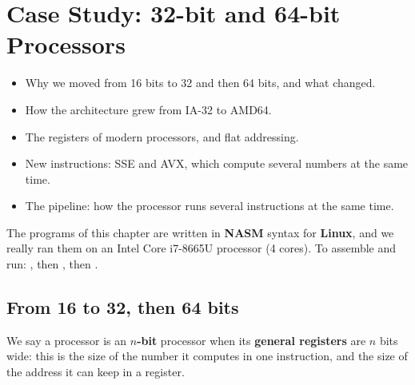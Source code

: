 \chapter{Case Study: 32-bit and 64-bit Processors}

\begin{khulasa}
\begin{itemize}
    \item Why we moved from 16 bits to 32 and then 64 bits, and what changed.
    \item How the architecture grew from IA-32 to AMD64.
    \item The registers of modern processors, and flat addressing.
    \item New instructions: SSE and AVX, which compute several numbers at the same time.
    \item The pipeline: how the processor runs several instructions at the same time.
\end{itemize}
\end{khulasa}

\begin{intabih}
    The programs of this chapter are written in \textbf{NASM} syntax for \textbf{Linux}, and we really ran them on an
    Intel Core i7-8665U processor (4 cores). To assemble and run:
    , then , then .
\end{intabih}

\section{From 16 to 32, then 64 bits}

\begin{tarif}
    We say a processor is an \textbf{$n$-bit} processor when its \textbf{general registers} are $n$ bits wide: this is
    the size of the number it computes in one instruction, and the size of the address it can keep in a register.
\end{tarif}

